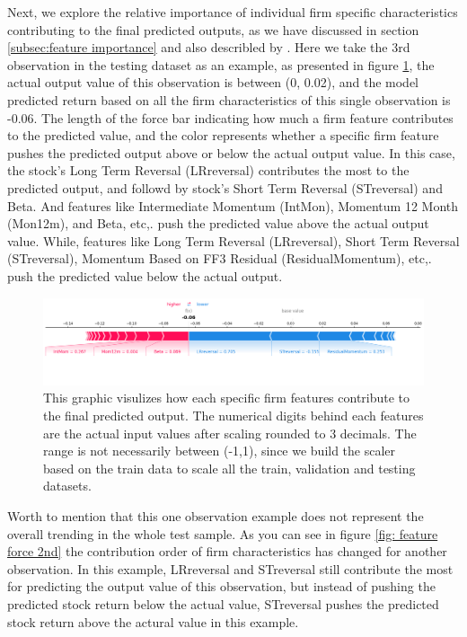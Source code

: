 Next, we explore the relative importance of individual firm specific characteristics contributing to the final predicted outputs, as we have discussed in section \ref{subsec:feature importance} and also describled by \citet*{lundberg2018explainable}. Here we take the 3rd observation in the testing dataset as an example, as presented in figure \ref{fig: feature force 1st}, the actual output value of this observation is between (0, 0.02), and the model predicted return based on all the firm characteristics of this single observation is -0.06. The length of the force bar indicating how much a firm feature contributes to the predicted value, and the color represents whether a specific firm feature pushes the predicted output above or below the actual output value. In this case, the stock's Long Term Reversal (LRreversal) contributes the most to the predicted output, and followd by stock's Short Term Reversal (STreversal) and Beta. And features like Intermediate Momentum (IntMon), Momentum 12 Month (Mon12m), and Beta, etc,. push the predicted value above the actual output value. While, features like Long Term Reversal (LRreversal), Short Term Reversal (STreversal), Momentum Based on FF3 Residual (ResidualMomentum), etc,. push the predicted value below the actual output.

\begin{figure}[H]
  \centering
  \caption{\textbf{SHAP Feature Force No.1}}
  \includegraphics[width=.8\textwidth]{images/3rd_shap_feature_force.png}
  \caption*{\footnotesize{This graphic visulizes how each specific firm features contribute to the final predicted output. The numerical digits behind each features are the actual input values after scaling rounded to 3 decimals. The range is not necessarily between (-1,1), since we build the scaler based on the train data to scale all the train, validation and testing datasets.}}
  \label{fig: feature force 1st}
\end{figure}

Worth to mention that this one observation example does not represent the overall trending in the whole test sample. As you can see in figure \ref{fig: feature force 2nd} the contribution order of firm characteristics has changed for another observation. In this example, LRreversal and STreversal still contribute the most for predicting the output value of this observation, but instead of pushing the predicted stock return below the actual value, STreversal pushes the predicted stock return above the actural value in this example.

